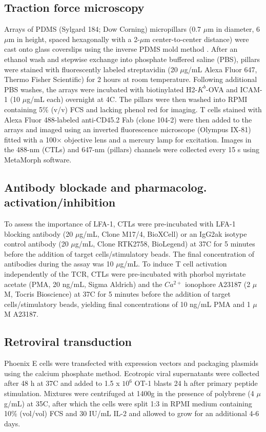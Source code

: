 \subsection{Traction force microscopy}
Arrays of PDMS (Sylgard 184; Dow Corning) micropillars (0.7 $\mu$m in diameter, 6 $\mu$m in height, spaced hexagonally with a 2-$\mu$m center-to-center distance) were cast onto glass coverslips using the inverse PDMS mold method \cite{Jin2017}. After an ethanol wash and stepwise exchange into phosphate buffered saline (PBS), pillars were stained with fluorescently labeled streptavidin (20 $\mu$g/mL Alexa Fluor 647, Thermo Fisher Scientific) for 2 hours at room temperature. Following additional PBS washes, the arrays were incubated with biotinylated H2-$K^{b}$-OVA and ICAM-1 (10 $\mu$g/mL each) overnight at 4\degree C. The pillars were then washed into RPMI containing 5\% (v/v) FCS and lacking phenol red for imaging. T cells stained with Alexa Fluor 488-labeled anti-CD45.2 Fab (clone 104-2) were then added to the arrays and imaged using an inverted fluorescence microscope (Olympus IX-81) fitted with a 100× objective lens and a mercury lamp for excitation. Images in the 488-nm (CTLs) and 647-nm (pillars) channels were collected every 15 s using MetaMorph software.

\subsection{Antibody blockade and pharmacolog. activation/inhibition}
To assess the importance of LFA-1, CTLs were pre-incubated with LFA-1 blocking antibody (20 $\mu$g/mL, Clone M17/4, BioXCell) or an IgG2ak isotype control antibody (20 $\mu$g/mL, Clone RTK2758, BioLegend) at 37\degree C for 5 minutes before the addition of target cells/stimulatory beads. The final concentration of antibodies during the assay was 10 $\mu$g/mL. To induce T cell activation independently of the TCR, CTLs were pre-incubated with phorbol myristate acetate (PMA, 20 ng/mL, Sigma Aldrich) and the $Ca^{2+}$ ionophore A23187 (2 $\mu$M, Tocris Bioscience) at 37\degree C for 5 minutes before the addition of target cells/stimulatory beads, yielding final concentrations of 10 ng/mL PMA and 1 $\mu$M A23187.

\subsection{Retroviral transduction}
Phoenix E cells were transfected with expression vectors and packaging plasmids using the calcium phosphate method. Ecotropic viral supernatants were collected after 48 h at 37\degree C and added to 1.5 x $10^{6}$ OT-1 blasts 24 h after primary peptide stimulation. Mixtures were centrifuged at 1400g in the presence of polybrene (4 $\mu$g/mL) at 35\degree C, after which the cells were split 1:3 in RPMI medium containing 10\% (vol/vol) FCS and 30 IU/mL IL-2 and allowed to grow for an additional 4-6 days.

